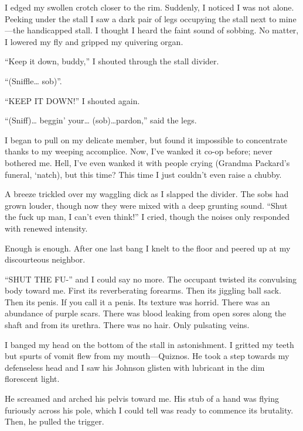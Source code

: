 I edged my swollen crotch closer to the rim. Suddenly, I noticed I
was not alone. Peeking under the stall I saw a dark pair of legs
occupying the stall next to mine---the handicapped stall. I
thought I heard the faint sound of sobbing. No matter, I lowered my
fly and gripped my quivering organ.



``Keep it down, buddy,'' I shouted through the stall
divider.

``(Sniffle{\ldots} sob)''.

``KEEP IT DOWN!'' I shouted again.

``(Sniff){\ldots} beggin' your{\ldots}
(sob){\ldots}pardon,'' said the legs.



I began to pull on my delicate member, but found it impossible to
concentrate thanks to my weeping accomplice. Now, I've wanked
it co-op before; never bothered me. Hell, I've even wanked it
with people crying (Grandma Packard's funeral, `natch),
but this time? This time I just couldn't even raise a
chubby.



A breeze trickled over my waggling dick as I slapped the divider.
The sobs had grown louder, though now they were mixed with a deep
grunting sound. ``Shut the fuck up man, I can't even
think!'' I cried, though the noises only responded with
renewed intensity.



Enough is enough. After one last bang I knelt to the floor and
peered up at my discourteous neighbor.



``SHUT THE FU-'' and I could say no more. The occupant
twisted its convulsing body toward me. First its reverberating
forearms. Then its jiggling ball sack. Then its penis. If you call
it a penis. Its texture was horrid. There was an abundance of
purple scars. There was blood leaking from open sores along the
shaft and from its urethra. There was no hair. Only pulsating
veins.



I banged my head on the bottom of the stall in astonishment. I
gritted my teeth but spurts of vomit flew from my
mouth---Quiznos. He took a step towards my defenseless head and
I saw his Johnson glisten with lubricant in the dim florescent
light.



He screamed and arched his pelvis toward me. His stub of a hand was
flying furiously across his pole, which I could tell was ready to
commence its brutality. Then, he pulled the trigger.



